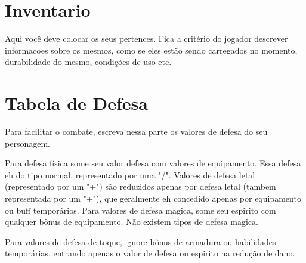 \section{Inventario} 

Aqui você deve colocar os seus pertences. Fica a critério do jogador descrever informacoes sobre os mesmos, como se eles estão sendo carregados no momento, durabilidade do mesmo, condições de uso etc.

\section{Tabela de Defesa}

Para facilitar o combate, escreva nessa parte os valores de defesa do seu personagem.

Para defesa física some seu valor defesa com valores de equipamento. Essa defesa eh do tipo normal, representado por uma "/". Valores de defesa letal (representado por um "+") são reduzidos apenas por defesa letal (tambem representada por um "+"), que geralmente eh concedido apenas por equipamento ou buff temporários.
Para valores de defesa magica, some seu espirito com qualquer bônus de equipamento. Não existem tipos de defesa magica.

Para valores de defesa de toque, ignore bônus de armadura ou habilidades temporárias, entrando apenas o valor de defesa ou espirito na redução de dano.






